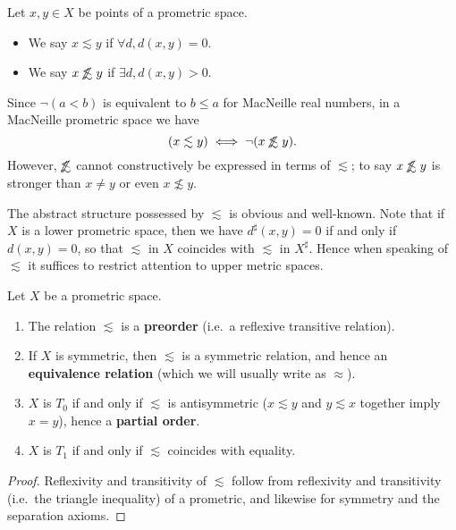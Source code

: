 \documentclass{article}
\def\upp#1{{#1}^{\sharp}}
\def\oapt{\mathrel{\!\not\,\not\lesssim}}
\def\leapx{\lesssim}
\begin{document}
\begin{defn}\label{def:promet-ord}
  Let $x,y\in X$ be points of a prometric space.
  \begin{itemize}
  \item We say $x\leapx y$ if $\forall d, d(x,y)=0$.
  \item We say $x\oapt y$ if $\exists d, d(x,y)>0$.
  \end{itemize}
\end{defn}

Since $\neg(a<b)$ is equivalent to $b\le a$ for MacNeille real numbers, in a MacNeille prometric space we have
\begin{equation}
  (x\leapx y) \iff \neg(x\oapt y).\label{eq:leapx-oapt}
\end{equation}
However, $\oapt$ cannot constructively be expressed in terms of $\leapx$; to say $x\oapt y$ is stronger than $x\neq y$ or even $x\not\leapx y$.

The abstract structure possessed by $\leapx$ is obvious and well-known.
Note that if $X$ is a lower prometric space, then we have $\upp{d}(x,y)=0$ if and only if $d(x,y)=0$, so that $\leapx$ in $X$ coincides with $\leapx$ in $\upp{X}$.
Hence when speaking of $\leapx$ it suffices to restrict attention to upper metric spaces.

\begin{thm}\label{thm:pmet-preord}
  Let $X$ be a prometric space.
  \begin{enumerate}
  \item The relation $\leapx$ is a \textbf{preorder} (i.e.\ a reflexive transitive relation).
  \item If $X$ is symmetric, then $\leapx$ is a symmetric relation, and hence an \textbf{equivalence relation} (which we will usually write as $\approx$).
  \item $X$ is $T_0$ if and only if $\leapx$ is antisymmetric ($x\leapx y$ and $y\leapx x$ together imply $x=y$), hence a \textbf{partial order}.
  \item $X$ is $T_1$ if and only if $\leapx$ coincides with equality.
  \end{enumerate}
\end{thm}
\begin{proof}
  Reflexivity and transitivity of $\leapx$ follow from reflexivity and transitivity (i.e.\ the triangle inequality) of a prometric, and likewise for symmetry and the separation axioms.
\end{proof}
\end{document}
